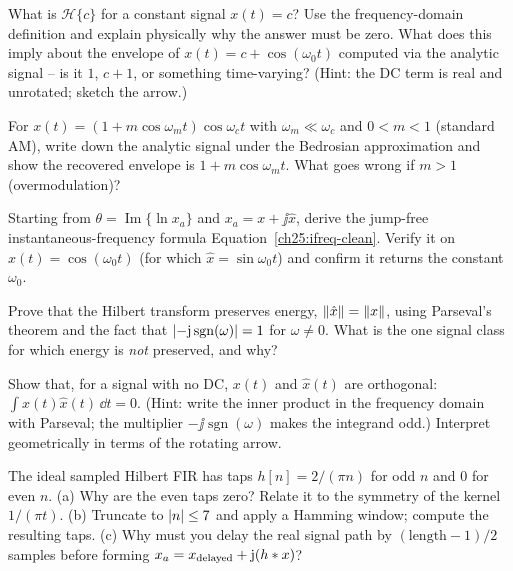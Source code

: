\begin{exercise}
\label{ch25:ex-dc}
What is $\mathcal{H}\{c\}$ for a constant signal $x(t)=c$? Use the frequency-domain
definition and explain physically why the answer must be zero. What does this imply about
the envelope of $x(t)=c + \cos(\omega_0 t)$ computed via the analytic signal -- is it
$1$, $c+1$, or something time-varying? (Hint: the DC term is real and unrotated; sketch
the arrow.)
\end{exercise}

\begin{exercise}
\label{ch25:ex-am-env}
For $x(t)=(1+m\cos\omega_m t)\cos\omega_c t$ with $\omega_m\ll\omega_c$ and $0<m<1$ (standard
AM), write down the analytic signal under the Bedrosian approximation and show the
recovered envelope is $1+m\cos\omega_m t$. What goes wrong if $m>1$ (overmodulation)?
\end{exercise}

\begin{exercise}
\label{ch25:ex-ifreq}
Starting from $\theta=\operatorname{Im}\{\ln x_a\}$ and $x_a=x+\jj\hat x$, derive the
jump-free instantaneous-frequency formula Equation~\eqref{ch25:ifreq-clean}. Verify it on
$x(t)=\cos(\omega_0 t)$ (for which $\hat x=\sin\omega_0 t$) and confirm it returns the
constant $\omega_0$.
\end{exercise}

\begin{exercise}
\label{ch25:ex-energy}
Prove that the Hilbert transform preserves energy, $\lVert\hat x\rVert=\lVert x\rVert$, using
Parseval's theorem and the fact that $\lvert-\mathrm{j}\operatorname{sgn}(\omega)\rvert=1$ for
$\omega\neq0$. What is the one signal class for which energy is \emph{not} preserved, and
why?
\end{exercise}

\begin{exercise}
\label{ch25:ex-orthogonal}
Show that, for a signal with no DC, $x(t)$ and $\hat x(t)$ are orthogonal:
$\int x(t)\hat x(t)\,\dd t = 0$. (Hint: write the inner product in the frequency domain
with Parseval; the multiplier $-\jj\operatorname{sgn}(\omega)$ makes the integrand odd.)
Interpret geometrically in terms of the rotating arrow.
\end{exercise}

\begin{exercise}
\label{ch25:ex-fir}
The ideal sampled Hilbert FIR has taps $h[n]=2/(\pi n)$ for odd $n$ and $0$ for even $n$.
(a) Why are the even taps zero? Relate it to the symmetry of the kernel $1/(\pi t)$.
(b) Truncate to $\lvert n\rvert\le 7$ and apply a Hamming window; compute the resulting taps. (c) Why
must you delay the real signal path by $(\text{length}-1)/2$ samples before forming
$x_a=x_{\text{delayed}}+\mathrm{j}(h\ast x)$?
\end{exercise}

